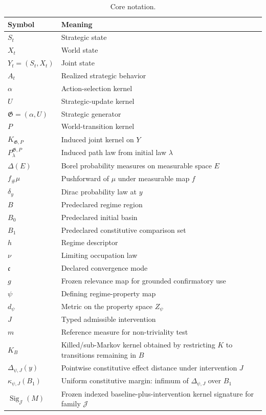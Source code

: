 \documentclass[10pt]{article}
\newcommand{\push}{\mathord{\#}}
\begin{document}
\begin{table}[htbp]
\centering
\small
\caption{Core notation.}
\label{tab:notation}
\begin{tabularx}{\textwidth}{@{}>{\raggedright\arraybackslash}p{}X@{}}
\toprule
\textbf{Symbol} & \textbf{Meaning}\\
\midrule
$S_t$ & Strategic state\\
$X_t$ & World state\\
$Y_t=(S_t,X_t)$ & Joint state\\
$A_t$ & Realized strategic behavior\\
$\alpha$ & Action-selection kernel\\
$U$ & Strategic-update kernel\\
$\mathfrak G=(\alpha,U)$ & Strategic generator\\
$P$ & World-transition kernel\\
$K_{\mathfrak G,P}$ & Induced joint kernel on $Y$\\
$P_{\lambda}^{\mathfrak G,P}$ & Induced path law from initial law $\lambda$\\
$\Delta(E)$ & Borel probability measures on measurable space $E$\\
$f_{\push}\mu$ & Pushforward of $\mu$ under measurable map $f$\\
$\delta_y$ & Dirac probability law at $y$\\
$B$ & Predeclared regime region\\
$B_0$ & Predeclared initial basin\\
$B_1$ & Predeclared constitutive comparison set\\
$h$ & Regime descriptor\\
$\nu$ & Limiting occupation law\\
$\mathfrak c$ & Declared convergence mode\\
$g$ & Frozen relevance map for grounded confirmatory use\\
$\psi$ & Defining regime-property map\\
$d_\psi$ & Metric on the property space $Z_\psi$\\
$J$ & Typed admissible intervention\\
$m$ & Reference measure for non-triviality test\\
$K_B$ & Killed/sub-Markov kernel obtained by restricting $K$ to transitions remaining in $B$\\
$\Delta_{\psi,J}(y)$ & Pointwise constitutive effect distance under intervention $J$\\
$\kappa_{\psi,J}(B_1)$ & Uniform constitutive margin: infimum of $\Delta_{\psi,J}$ over $B_1$\\
$\operatorname{Sig}_{\mathcal J}(M)$ & Frozen indexed baseline-plus-intervention kernel signature for family $\mathcal J$\\
\bottomrule
\end{tabularx}
\end{table}
\end{document}
